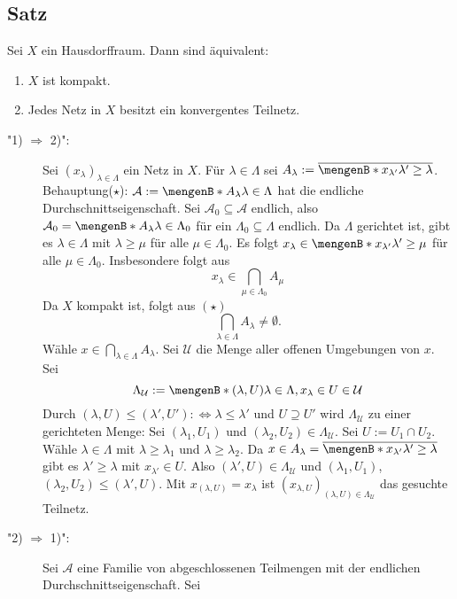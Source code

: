 \subsection[Satz: Charakterisierung von Kompaktheit durch konvergente Teilnetze]{Satz} %
\label{sub:45}
Sei $X$ ein Hausdorffraum. Dann sind äquivalent:
	\begin{enumerate}[1)]
		\item $X$ ist kompakt.
		\item Jedes Netz in $X$ besitzt ein konvergentes Teilnetz.
	\end{enumerate}
\begin{description}
	\item["1) $\Rightarrow $ 2)":] Sei $(x_\lambda )_{\lambda  \in \Lambda}$ ein Netz in $X$. Für $\lambda  \in \Lambda$ sei 
	$A_\lambda := \overline{\set[x_{\lambda'}]{\lambda '  \ge \lambda } }$. \\
	Behauptung($\star$): $\mathcal{A} := \set[A_\lambda ]{\lambda  \in \Lambda}  $ hat die endliche Durchschnittseigenschaft. Sei 
	$\mathcal{A}_0 \subseteq \mathcal{A}$ endlich, also
	$\mathcal{A}_0 = \set[A_\lambda ]{\lambda \in \Lambda_0}  $ für ein $\Lambda_0 \subseteq \Lambda$ endlich. Da $\Lambda$ gerichtet ist, gibt es $\lambda \in \Lambda$ mit
	$\lambda \ge \mu$ für alle $\mu \in \Lambda_0$. Es folgt $x_\lambda \in \set[x_{\lambda'}]{\lambda ' \ge \mu} $ für alle $\mu \in \Lambda_0$. Insbesondere folgt aus 
	\[
		x_\lambda \in \bigcap_{\mu \in \Lambda_0} A_\mu
	\]
	Da $X$ kompakt ist, folgt aus $(\star)$
	\[
		\bigcap_{\lambda  \in \Lambda} A_\lambda \not= \emptyset.
	\]
	Wähle $x \in \bigcap_{\lambda  \in \Lambda} A_\lambda$. Sei $\mathcal{U} $ die Menge aller offenen Umgebungen von $x$. Sei 
	\[
		\Lambda_\mathcal{U} := \set[(\lambda , U)]{\lambda \in \Lambda, x_\lambda \in U \in \mathcal{U}}
	\]
	Durch $(\lambda , U) \le (\lambda', U') :\Leftrightarrow \lambda \le \lambda'$ und $U \supseteq U'$ wird $\Lambda_\mathcal{U}$ zu einer gerichteten Menge: 
	Sei $(\lambda_1, U_1)$ und $(\lambda _2, U_2) \in \Lambda_\mathcal{U}$. Sei $U := U_1 \cap U_2$. Wähle $\lambda \in \Lambda$ mit $\lambda \ge \lambda_1$ und 
	$\lambda  \ge \lambda_2$. Da $x \in A_\lambda = \overline{\set[x_{\lambda'}]{\lambda' \ge \lambda}} $ gibt es $\lambda' \ge \lambda $ mit $x_{\lambda'} \in U$.
	Also $(\lambda', U) \in \Lambda_\mathcal{U} $ und $(\lambda_1, U_1)$, $(\lambda_2, U_2) \le (\lambda', U)$. Mit $x_{(\lambda , U)} = x_\lambda $ ist 
	$(x_{\lambda , U})_{(\lambda ,U) \in \Lambda_\mathcal{U} }$ das gesuchte Teilnetz.
	\item["2) $\Rightarrow $ 1)":] Sei $\mathcal{A}$ eine Familie von abgeschlossenen Teilmengen mit der endlichen Durchschnittseigenschaft. Sei 

\end{description}
